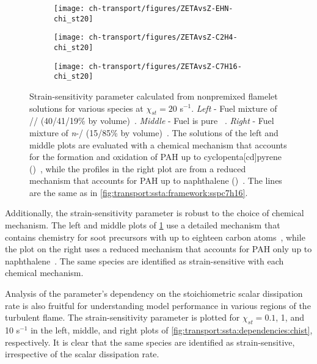\begin{figure}[ht]
  \centering
  \begin{subfigure}[b]{0.33\linewidth}
    \texttt{[image: ch-transport/figures/ZETAvsZ-EHN-chi\_st20]}
  \end{subfigure}%
  \begin{subfigure}[b]{0.33\linewidth}
    \texttt{[image: ch-transport/figures/ZETAvsZ-C2H4-chi\_st20]}
  \end{subfigure}%
  \begin{subfigure}[b]{0.33\linewidth}
    \texttt{[image: ch-transport/figures/ZETAvsZ-C7H16-chi\_st20]}
  \end{subfigure}
  \caption[Dependencies of Strain-Sensitivity Parameter \texorpdfstring{$\zeta_k$}{Zk} on Fuel Mixture and Chemical Mechanism]{Strain-sensitivity parameter calculated from nonpremixed flamelet solutions for various species at $\chi_{st} = 20$ s$^{-1}$. \textit{Left} - Fuel mixture of // (40/41/19\% by volume)~\cite{mahmoud2017}. \textit{Middle} - Fuel is pure ~\cite{shaddix2010,zhang2011}. \textit{Right} - Fuel mixture of \textit{n}-/ (15/85\% by volume)~\cite{bisetti2012,attili2014,attili2015}. The solutions of the left and middle plots are evaluated with a chemical mechanism that accounts for the formation and oxidation of PAH up to cyclopenta[cd]pyrene ()~\cite{blanquart2009588,narayanaswamy2010}, while the profiles in the right plot are from a reduced mechanism that accounts for PAH up to naphthalene ()~\cite{bisetti2012}. The lines are the same as in \cref{fig:transport:ssta:framework:sspc7h16}.}
  \label{fig:transport:ssta:dependencies:fuelchem}
\end{figure}

Additionally, the strain-sensitivity parameter is robust to the choice of chemical mechanism. The left and middle plots of \cref{fig:transport:ssta:dependencies:fuelchem} use a detailed mechanism that contains chemistry for soot precursors with up to eighteen carbon atoms~\cite{blanquart2009588,narayanaswamy2010}, while the plot on the right uses a reduced mechanism that accounts for PAH only up to naphthalene~\cite{bisetti2012}. The same species are identified as strain-sensitive with each chemical mechanism. 

Analysis of the parameter's dependency on the stoichiometric scalar dissipation rate is also fruitful for understanding model performance in various regions of the turbulent flame. The strain-sensitivity parameter is plotted for $\chi_{st} = 0.1$, 1, and 10 s$^{-1}$ in the left, middle, and right plots of \cref{fig:transport:ssta:dependencies:chist}, respectively. It is clear that the same species are identified as strain-sensitive, irrespective of the scalar dissipation rate.

